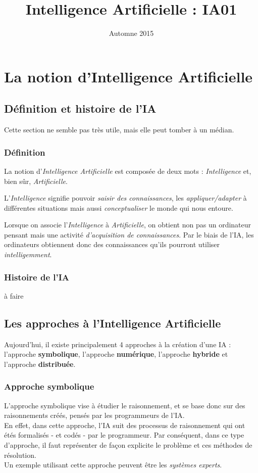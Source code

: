 \documentclass{report}
\title{Intelligence Artificielle : \textbf{IA01}}
\author{}
\date{Automne 2015}
\begin{document}
\maketitle{}

\tableofcontents


\chapter{La notion d'Intelligence Artificielle}

\section{Définition et histoire de l'IA}
Cette section ne semble pas très utile, mais elle peut tomber à un médian.
\subsection{Définition}
La notion d'\emph{Intelligence Artificielle} est composée de deux mots : \emph{Intelligence} et, bien sûr, \emph{Artificielle}.
\par
L'\emph{Intelligence} signifie pouvoir \emph{saisir des connaissances}, les \emph{appliquer/adapter} à différentes situations mais aussi \emph{conceptualiser} le monde qui nous entoure.
\par
Lorsque on associe l'\emph{Intelligence} à \emph{Artificielle}, on obtient non pas un ordinateur pensant mais une activité \emph{d'acquisition de connaissances}.
Par le biais de l'IA, les ordinateurs obtiennent donc des connaissances qu'ils pourront utiliser \emph{intelligemment}.

\subsection{Histoire de l'IA}
à faire

\section{Les approches à l'Intelligence Artificielle}
Aujourd'hui, il existe principalement 4 approches à la création d'une IA : l'approche \textbf{symbolique}, l'approche \textbf{numérique}, l'approche \textbf{hybride} et l'approche \textbf{distribuée}.
\subsection{Approche symbolique}
L'approche symbolique vise à étudier le raisonnement, et se base donc sur des raisonnements créés, pensés par les programmeurs de l'IA.\\
En effet, dans cette approche, l'IA suit des processus de raisonnement qui ont étés formalisés - et codés - par le programmeur.
Par conséquent, dans ce type d'approche, il faut représenter de façon explicite le problème et ces méthodes de résolution.\\
Un exemple utilisant cette approche peuvent être les \emph{systèmes experts}.
\end{document}
